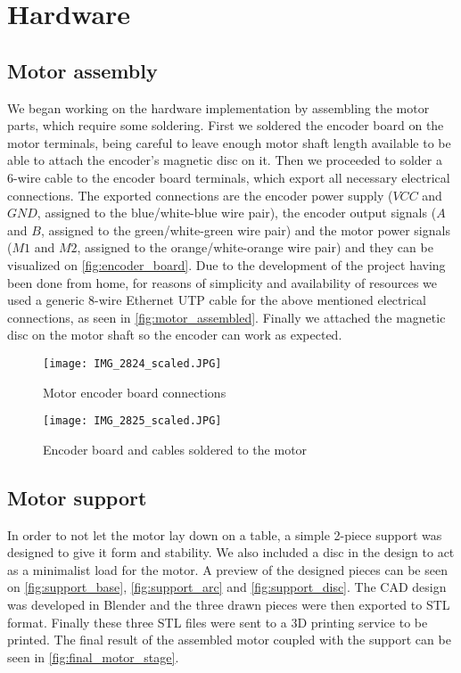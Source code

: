 \section{Hardware} \label{sec:hardware-devel}

\subsection{Motor assembly}
We began working on the hardware implementation by assembling the motor parts, which require some soldering.
First we soldered the encoder board on the motor terminals, being careful to leave enough motor shaft length available to be able to attach the encoder's magnetic disc on it.
Then we proceeded to solder a 6-wire cable to the encoder board terminals, which export all necessary electrical connections.
The exported connections are the encoder power supply ($VCC$ and $GND$, assigned to the blue/white-blue wire pair), the encoder output signals ($A$ and $B$, assigned to the green/white-green wire pair) and the motor power signals ($M1$ and $M2$, assigned to the orange/white-orange wire pair) and they can be visualized on \autoref{fig:encoder_board}.
Due to the development of the project having been done from home, for reasons of simplicity and availability of resources we used a generic 8-wire Ethernet UTP cable for the above mentioned electrical connections, as seen in \autoref{fig:motor_assembled}.
Finally we attached the magnetic disc on the motor shaft so the encoder can work as expected.

\begin{figure}[htp]
	\centering
	\texttt{[image: IMG\_2824\_scaled.JPG]}
	\caption{Motor encoder board connections}
	\label{fig:encoder_board}
\end{figure}

\begin{figure}[htp]
	\centering
	\texttt{[image: IMG\_2825\_scaled.JPG]}
	\caption{Encoder board and cables soldered to the motor}
	\label{fig:motor_assembled}
\end{figure}

\subsection{Motor support}
In order to not let the motor lay down on a table, a simple 2-piece support was designed to give it form and stability.
We also included a disc in the design to act as a minimalist load for the motor.
A preview of the designed pieces can be seen on \autoref{fig:support_base}, \autoref{fig:support_arc} and \autoref{fig:support_disc}.
The CAD design was developed in Blender \cite{sw:blender} and the three drawn pieces were then exported to STL format.
Finally these three STL files were sent to a 3D printing service to be printed.
The final result of the assembled motor coupled with the support can be seen in \autoref{fig:final_motor_stage}.

